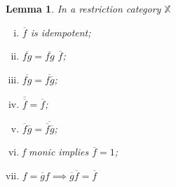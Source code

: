 \documentclass[11pt, oneside]{amsart}
\newtheorem{lemma}{Lemma}
\theoremstyle{definition}
\theoremstyle{definition}
\begin{document}
\begin{lemma}
In a restriction category $\mathbb{X}$

\begin{multicols}{2}
\begin{enumerate}[(i)]
\item $\overline{f}$ is idempotent;            
\item $\overline{fg}={\overline{fg}}$ $\overline{f}$;
\item $\overline{fg}=\overline{f\overline{g}}$;
\item $\overline{\overline{f}}=\overline{f}$;
\columnbreak

\item $\overline{f}\overline{g}=\overline{\overline{f}\overline{g}}$;
\item f monic implies $\overline{f}=1$;
\item ${f=\overline{g}f \implies \overline{g}\overline{f}=\overline{f}}$

\end{enumerate}
\end{multicols}



\end{lemma}
\end{document}

